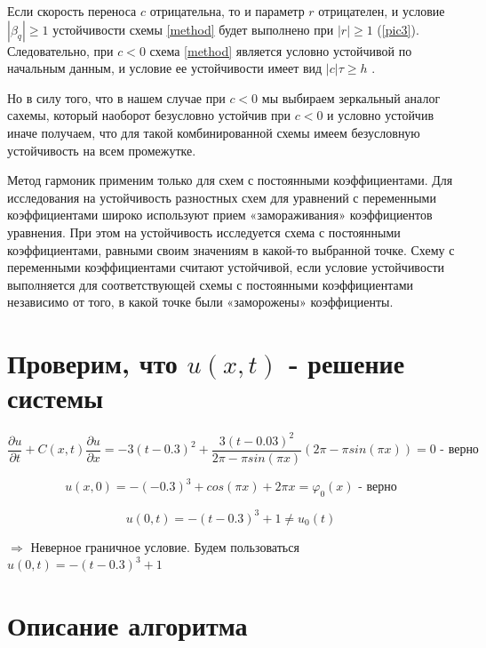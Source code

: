 \documentclass[12pt,a4paper]{scrartcl}
\begin{document}
Если скорость переноса $c$ отрицательна, то и параметр $r$ отрицателен, и условие $| \beta_q| \ge 1$ устойчивости схемы \eqref{method} будет выполнено при $|r| \ge 1$ (\eqref{pic3}). Следовательно, при $c < 0$ схема \eqref{method} является условно устойчивой по начальным данным, и условие ее устойчивости имеет вид $|c|\tau \ge h$ . 
	
Но в силу того, что в нашем случае при $c < 0$ мы выбираем зеркальный аналог сахемы, который наоборот безусловно устойчив при $c < 0$ и условно устойчив иначе получаем, что для такой комбинированной схемы имеем безусловную устойчивость на всем промежутке.
	
Метод гармоник применим только для схем с постоянными коэффициентами. Для исследования на устойчивость разностных схем для уравнений с переменными коэффициентами широко используют прием «замораживания» коэффициентов уравнения. При этом на устойчивость исследуется схема с постоянными коэффициентами, равными своим значениям в какой-то выбранной точке. Схему с переменными коэффициентами считают устойчивой, если условие устойчивости выполняется для соответствующей схемы с постоянными коэффициентами независимо от того, в какой точке были «заморожены» коэффициенты.
	
	
\section{Проверим, что $u(x,t)$ - решение системы}

\[
	\frac{\partial u}{\partial t}+C(x,t) \frac{\partial u}{\partial x}=-3(t-0.3)^2+\frac{3(t-0.03)^2}{2 \pi - \pi sin(\pi x)}(2 \pi - \pi sin(\pi x))=0 \text{ - верно}
\]

\[
	u(x,0) =-(-0.3)^3+cos(\pi x)+2 \pi x= \varphi_0(x) \text{ - верно}
\]

\[
	u(0,t) = -(t-0.3)^3+1 \ne u_0(t) 
\]

$\Rightarrow $ Неверное граничное условие. Будем пользоваться $ u(0,t) = -(t-0.3)^3+1$

\newpage
\section{Описание алгоритма}
\end{document}
